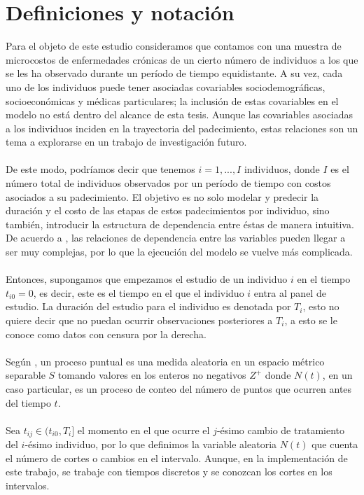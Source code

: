 \section{Definiciones y notaci\'on}
Para el objeto de este estudio consideramos que contamos con una muestra de microcostos de enfermedades cr\'onicas de un cierto n\'umero de individuos a los que se les ha observado durante un per\'iodo de tiempo equidistante. A su vez, cada uno de los individuos puede tener asociadas covariables sociodemogr\'aficas, socioecon\'omicas y m\'edicas particulares; la inclusi\'on de estas covariables en el modelo no est\'a dentro del alcance de esta tesis. Aunque las covariables asociadas a los individuos inciden en la trayectoria del padecimiento, estas relaciones son un tema a explorarse en un trabajo de investigaci\'on futuro.\\
\\
De este modo, podr\'iamos decir que tenemos $i=1,...,I$ individuos, donde $I$ es el n\'umero total de individuos observados por un per\'iodo de tiempo con costos asociados a su padecimiento. El objetivo es no solo modelar y predecir la duraci\'on y el costo de las etapas de estos padecimientos por individuo, sino tambi\'en, introducir la estructura de dependencia entre \'estas de manera intuitiva. De acuerdo a \cite{daley2003}, las relaciones de dependencia entre las variables pueden llegar a ser muy complejas, por lo que la ejecuci\'on del modelo se vuelve m\'as complicada.\\ 
\\
Entonces, supongamos que empezamos el estudio de un individuo $i$ en el tiempo $t_{i0}=0$, es decir, este es el tiempo en el que el individuo $i$ entra al panel de estudio. La duraci\'on del estudio para el individuo es denotada por $T_i$, esto no quiere decir que no puedan ocurrir observaciones posteriores a $T_i$, a esto se le conoce como datos con censura por la derecha.\\
\\
Seg\'un \cite{intropp}, un proceso puntual es una medida aleatoria en un espacio m\'etrico separable $S$ tomando valores en los enteros no negativos $Z^+$ donde $N(t)$, en un caso particular, es un proceso de conteo del n\'umero de puntos que ocurren antes del tiempo $t$.\\
\\
Sea $t_{ij} \in (t_{i0},T_i]$ el momento en el que ocurre el $j$-\'esimo cambio de tratamiento del $i$-\'esimo individuo, por lo que definimos la variable aleatoria $N(t)$ que cuenta el n\'umero de cortes o cambios en el intervalo. Aunque, en la implementaci\'on de este trabajo, se trabaje con tiempos discretos y se conozcan los cortes en los intervalos.\\
